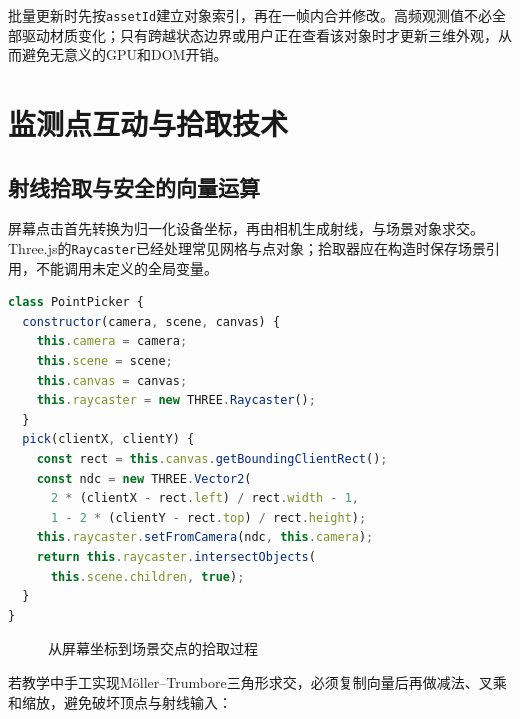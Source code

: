 批量更新时先按\texttt{assetId}建立对象索引，再在一帧内合并修改。高频观测值不必全部驱动材质变化；只有跨越状态边界或用户正在查看该对象时才更新三维外观，从而避免无意义的GPU和DOM开销。

\section{监测点互动与拾取技术}\label{sec:monitoring-interaction}

\subsection{射线拾取与安全的向量运算}

屏幕点击首先转换为归一化设备坐标，再由相机生成射线，与场景对象求交。Three.js的\texttt{Raycaster}已经处理常见网格与点对象；拾取器应在构造时保存场景引用，不能调用未定义的全局变量。

\begin{lstlisting}[language=JavaScript]
class PointPicker {
  constructor(camera, scene, canvas) {
    this.camera = camera;
    this.scene = scene;
    this.canvas = canvas;
    this.raycaster = new THREE.Raycaster();
  }
  pick(clientX, clientY) {
    const rect = this.canvas.getBoundingClientRect();
    const ndc = new THREE.Vector2(
      2 * (clientX - rect.left) / rect.width - 1,
      1 - 2 * (clientY - rect.top) / rect.height);
    this.raycaster.setFromCamera(ndc, this.camera);
    return this.raycaster.intersectObjects(
      this.scene.children, true);
  }
}
\end{lstlisting}

\begin{figure}[htbp]
\centering
{}
\caption{从屏幕坐标到场景交点的拾取过程}
\label{fig:ray-picking}
\end{figure}

若教学中手工实现M\"oller--Trumbore三角形求交，必须复制向量后再做减法、叉乘和缩放，避免破坏顶点与射线输入：

